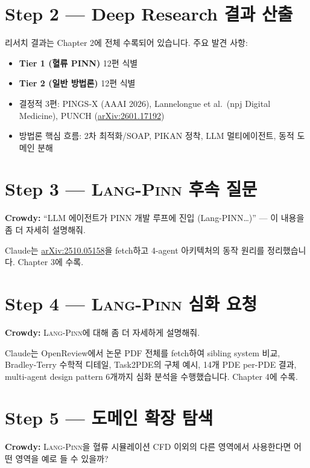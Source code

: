 \documentclass[11pt,a4paper,oneside]{report}
\newcommand{\langpinn}{\textsc{Lang-Pinn}}
\newcommand{\arxivid}[1]{\href{https://arxiv.org/abs/#1}{arXiv:#1}}
\begin{document}
\section{Step 2 --- Deep Research 결과 산출}

리서치 결과는 Chapter 2에 전체 수록되어 있습니다. 주요 발견 사항:
\begin{itemize}
\item \textbf{Tier 1 (혈류 PINN)} 12편 식별
\item \textbf{Tier 2 (일반 방법론)} 12편 식별
\item 결정적 3편: PINGS-X (AAAI 2026), Lannelongue et al.\ (npj Digital Medicine), PUNCH (\arxivid{2601.17192})
\item 방법론 핵심 흐름: 2차 최적화/SOAP, PIKAN 정착, LLM 멀티에이전트, 동적 도메인 분해
\end{itemize}

\section{Step 3 --- \langpinn{} 후속 질문}

\begin{quotebox}
\textbf{Crowdy:} ``LLM 에이전트가 PINN 개발 루프에 진입 (Lang-PINN\ldots)'' --- 이 내용을 좀 더 자세히 설명해줘.
\end{quotebox}

Claude는 \arxivid{2510.05158}을 fetch하고 4-agent 아키텍처의 동작 원리를 정리했습니다. Chapter 3에 수록.

\section{Step 4 --- \langpinn{} 심화 요청}

\begin{quotebox}
\textbf{Crowdy:} \langpinn{}에 대해 좀 더 자세하게 설명해줘.
\end{quotebox}

Claude는 OpenReview에서 논문 PDF 전체를 fetch하여 sibling system 비교, Bradley-Terry 수학적 디테일, Task2PDE의 구체 예시, 14개 PDE per-PDE 결과, multi-agent design pattern 6개까지 심화 분석을 수행했습니다. Chapter 4에 수록.

\section{Step 5 --- 도메인 확장 탐색}

\begin{quotebox}
\textbf{Crowdy:} \langpinn{}을 혈류 시뮬레이션 CFD 이외의 다른 영역에서 사용한다면 어떤 영역을 예로 들 수 있을까?
\end{quotebox}
\end{document}
